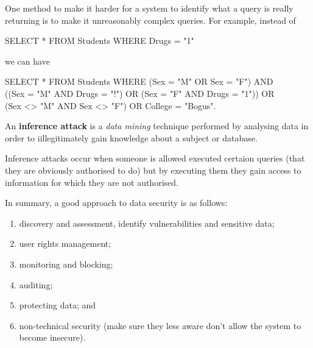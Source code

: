 \begin{example}
    One method to make it harder for a system to identify what a query is really returning is to make it unreasonably complex queries. For example, instead of
    \begin{center}
        \ttfamily
        SELECT * FROM Students WHERE Drugs = "1"
    \end{center}
    we can have
    \begin{center}
        \ttfamily
        SELECT * FROM Students WHERE (Sex = "M" OR Sex = "F") AND \\
        ((Sex = "M" AND Drugs = "!") OR (Sex = "F" AND Drugs = "1")) OR \\
        (Sex <> "M" AND Sex <> "F") OR College = "Bogus".
    \end{center}
\end{example}

\begin{definition}
    An \textbf{inference attack} is a \emph{data mining} technique performed by analysing data in order to iillegitimately gain knowledge about a subject or database.
\end{definition}

Inference attacks occur when someone is allowed executed certaion queries (that they are obviously authorised to do) but by executing them they gain access to information for which they are not authorised. 

In summary, a good approach to data security is as follows:
\begin{enumerate}
    \item discovery and assessment, identify vulnerabilities and sensitive data;
    \item user rights management;
    \item monitoring and blocking;
    \item auditing;
    \item protecting data; and
    \item non-technical security (make sure they less aware don't allow the system to become insecure).
\end{enumerate}
